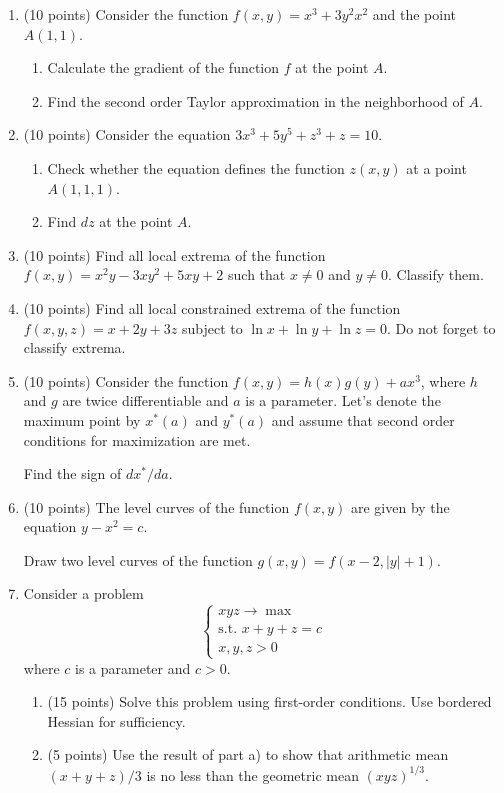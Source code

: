 \begin{enumerate}

\item (10 points) Consider the function $f(x, y) = x^3 + 3y^2 x^2$ and the point $A(1,1)$.
\begin{enumerate}
  \item Calculate the gradient of the function $f$ at the point $A$.
  \item Find the second order Taylor approximation in the neighborhood of $A$.
\end{enumerate}

\item (10 points) Consider the equation $3x^3 + 5y^5 + z^3 + z=10$. 
\begin{enumerate}
  \item Check whether the equation defines the function $z(x, y)$ at a point $A(1,1,1)$.
  \item Find $dz$ at the point $A$.
\end{enumerate}


\item (10 points) Find all local extrema of the function $f(x, y) = x^2 y - 3xy^2 + 5xy +2$ such that $x\neq 0$ and $y\neq 0$. 
Classify them.

\item (10 points) Find all local constrained extrema 
of the function $f(x, y, z) = x + 2y + 3z$ subject to $\ln x + \ln y + \ln z = 0$.
Do not forget to classify extrema. 

\item (10 points) Consider the function $f(x, y) = h(x) g(y) + ax^3$, where $h$ and $g$ are twice differentiable
and $a$ is a parameter. Let's denote the maximum point by $x^*(a)$ and $y^*(a)$ and assume that second order conditions for maximization are met.

Find the sign of $dx^*/da$. 

\item (10 points) The level curves of the function $f(x,y)$ are given by the equation $y - x^2 = c$.

Draw two level curves of the function $g(x,y)=f(x-2, |y| + 1)$.

\item Consider a problem 
\[
  \begin{cases}
xyz \to \max \\
\text{s.t. } x+ y+ z = c \\
x, y, z >0 
  \end{cases}
\]
where $c$ is a parameter and $c>0$.
\begin{enumerate}
  \item (15 points) Solve this problem using first-order conditions. Use bordered
Hessian for sufficiency.
\item (5 points) Use the result of part a) to show that arithmetic mean 
$(x + y + z)/3$ is 
no less than the geometric mean  $(xyz)^{1/3}$.
\end{enumerate}


\end{enumerate}
